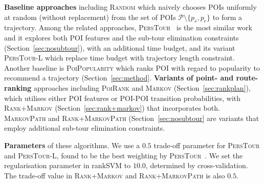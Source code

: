 {\bf Baseline approaches} including \textsc{Random} which naively chooses POIs uniformly at random
(without replacement) from the set of POIs $\mathcal{P} \setminus \{p_s, p_e \}$ to form a trajectory.
Among the related approaches, \textsc{PersTour}~\cite{ijcai15} is the most similar work and it
explores both POI features and the sub-tour elimination constraints (Section~\ref{sec:nosubtour}),
with an additional time budget, and its variant \textsc{PersTour-L} which replace time budget with
trajectory length constraint.
Another baseline is \textsc{PoiPopularity} %
which ranks POI with regard to popularity to recommend a trajectory (Section~\ref{sec:method}.
%
{\bf Variants of point- and route-ranking} approaches including \textsc{PoiRank} and \textsc{Markov} (Section~\ref{sec:rankplan}),
which utilises either POI features or POI-POI transition probabilities,
with \textsc{Rank+Markov} (Section~\ref{sec:rank+markov}) that incorporates both. %
\textsc{MarkovPath} and \textsc{Rank+MarkovPath} (Section~\ref{sec:nosubtour} are variants that employ 
additional sub-tour elimination constraints.

{\bf Parameters} of these algorithms.
We use a $0.5$ trade-off parameter for \textsc{PersTour} and \textsc{PersTour-L},
found to be the best weighting by \textsc{PersTour}~\cite{ijcai15}.
We set the regularisation parameter in rankSVM to  $10.0$, determined by cross-validation.
The trade-off value in \textsc{Rank+Markov} and \textsc{Rank+MarkovPath} is also $0.5$.


